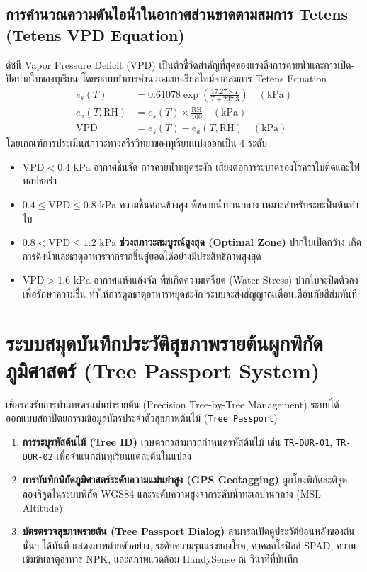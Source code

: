 \subsection{การคำนวณความดันไอน้ำในอากาศส่วนขาดตามสมการ Tetens (Tetens VPD Equation)}
ดัชนี Vapor Pressure Deficit (VPD) เป็นตัวชี้วัดสำคัญที่สุดของแรงดึงการคายน้ำและการเปิด-ปิดปากใบของทุเรียน โดยระบบทำการคำนวณแบบเรียลไทม์จากสมการ Tetens Equation
\begin{align}
  e_s(T) &= 0.61078 \exp\left( \frac{17.27 \times T}{T + 237.3} \right) \quad (\text{kPa}) \\
  e_a(T, \text{RH}) &= e_s(T) \times \frac{\text{RH}}{100} \quad (\text{kPa}) \\
  \text{VPD} &= e_s(T) - e_a(T, \text{RH}) \quad (\text{kPa})
\end{align}
โดยเกณฑ์การประเมินสภาวะทางสรีรวิทยาของทุเรียนแบ่งออกเป็น 4 ระดับ
\begin{itemize}
  \item $\text{VPD} < 0.4\text{ kPa}$ อากาศชื้นจัด การคายน้ำหยุดชะงัก เสี่ยงต่อการระบาดของโรคราใบติดและไฟทอปธอร่า
  \item $0.4 \le \text{VPD} \le 0.8\text{ kPa}$ ความชื้นค่อนข้างสูง พืชคายน้ำปานกลาง เหมาะสำหรับระยะฟื้นต้นทำใบ
  \item $0.8 < \text{VPD} \le 1.2\text{ kPa}$ \textbf{ช่วงสภาวะสมบูรณ์สูงสุด (Optimal Zone)} ปากใบเปิดกว้าง เกิดการดึงน้ำและธาตุอาหารจากรากขึ้นสู่ยอดได้อย่างมีประสิทธิภาพสูงสุด
  \item $\text{VPD} > 1.6\text{ kPa}$ อากาศแห้งแล้งจัด พืชเกิดความเครียด (Water Stress) ปากใบจะปิดตัวลงเพื่อรักษาความชื้น ทำให้การดูดธาตุอาหารหยุดชะงัก ระบบจะส่งสัญญาณเตือนเตือนภัยสีส้มทันที
\end{itemize}

\section{ระบบสมุดบันทึกประวัติสุขภาพรายต้นผูกพิกัดภูมิศาสตร์ (Tree Passport System)}
เพื่อรองรับการทำเกษตรแม่นยำรายต้น (Precision Tree-by-Tree Management) ระบบได้ออกแบบสถาปัตยกรรมข้อมูลบัตรประจำตัวสุขภาพต้นไม้ (\texttt{Tree Passport})
\begin{enumerate}
  \item \textbf{การระบุรหัสต้นไม้ (Tree ID)} เกษตรกรสามารถกำหนดรหัสต้นไม้ เช่น \texttt{TR-DUR-01}, \texttt{TR-DUR-02} เพื่อจำแนกต้นทุเรียนแต่ละต้นในแปลง
  \item \textbf{การบันทึกพิกัดภูมิศาสตร์ระดับความแม่นยำสูง (GPS Geotagging)} ผูกโยงพิกัดละติจูด-ลองจิจูดในระบบพิกัด WGS84 และระดับความสูงจากระดับน้ำทะเลปานกลาง (MSL Altitude)
  \item \textbf{บัตรตรวจสุขภาพรายต้น (Tree Passport Dialog)} สามารถเปิดดูประวัติย้อนหลังของต้นนั้นๆ ได้ทันที แสดงภาพถ่ายตัวอย่าง, ระดับความรุนแรงของโรค, ค่าคลอโรฟิลล์ SPAD, ความเข้มข้นธาตุอาหาร NPK, และสภาพแวดล้อม HandySense ณ วินาทีที่บันทึก
\end{enumerate}

